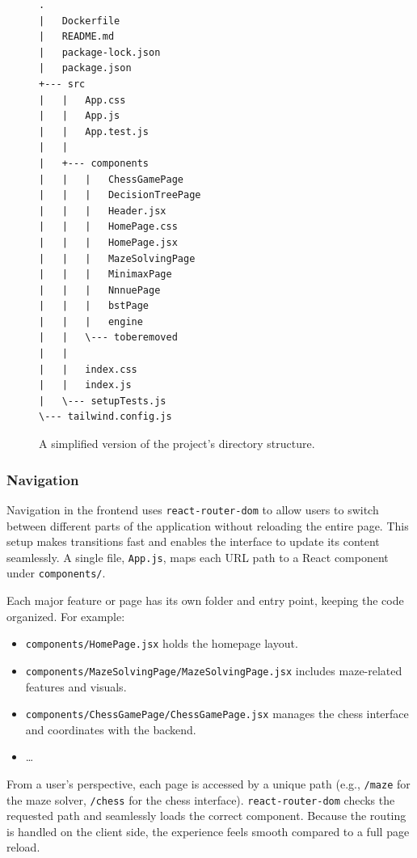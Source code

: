 \documentclass[12pt,a4paper]{article}
\begin{document}
\begin{figure}[ht]
  \begin{center}
    \begin{minipage}{0.5\linewidth} %
\begin{lstlisting}[numbers=none,frame=none,basicstyle=\ttfamily\footnotesize,breaklines=true]
.
|   Dockerfile
|   README.md
|   package-lock.json
|   package.json
+--- src
|   |   App.css
|   |   App.js
|   |   App.test.js
|   |
|   +--- components
|   |   |   ChessGamePage
|   |   |   DecisionTreePage
|   |   |   Header.jsx
|   |   |   HomePage.css
|   |   |   HomePage.jsx
|   |   |   MazeSolvingPage
|   |   |   MinimaxPage
|   |   |   NnnuePage
|   |   |   bstPage
|   |   |   engine
|   |   \--- toberemoved
|   |
|   |   index.css
|   |   index.js
|   \--- setupTests.js
\--- tailwind.config.js
\end{lstlisting}
    \end{minipage}
  \end{center}
  \caption{A simplified version of the project's directory structure.}
  \label{fig:directory-structure1}
\end{figure}

  \subsubsection{Navigation}

Navigation in the frontend uses \texttt{react-router-dom} to allow users to switch between different parts of the application without reloading the entire page. This setup makes transitions fast and enables the interface to update its content seamlessly. A single file, \texttt{App.js}, maps each URL path to a React component under \texttt{components/}.

Each major feature or page has its own folder and entry point, keeping the code organized. For example: \begin{itemize} \item \texttt{components/HomePage.jsx} holds the homepage layout. \item \texttt{components/MazeSolvingPage/MazeSolvingPage.jsx} includes maze-related features and visuals. \item \texttt{components/ChessGamePage/ChessGamePage.jsx} manages the chess interface and coordinates with the backend. \item \ldots \end{itemize}

From a user’s perspective, each page is accessed by a unique path (e.g., \texttt{/maze} for the maze solver, \texttt{/chess} for the chess interface). \texttt{react-router-dom} checks the requested path and seamlessly loads the correct component. Because the routing is handled on the client side, the experience feels smooth compared to a full page reload.
\end{document}
